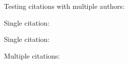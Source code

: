 \documentclass{article}
\begin{document}
Testing citations with multiple authors:

Single citation: \cite{Denning2022}

Single citation: \cite{Denning2022a}

Multiple citations: \cite{Denning2022, Denning2022a}

\printbibliography
\end{document}
